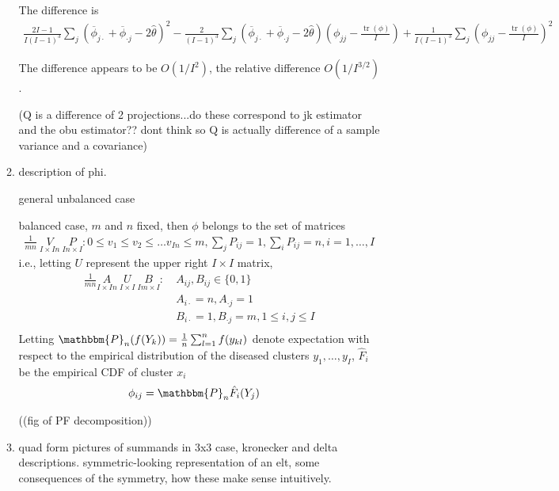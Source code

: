 \documentclass{article}
\DeclareMathOperator{\tr}{tr}
\newcommand{\I}{I}
\newcommand{\rowmean}[1]{\overline{\phi}_{#1\cdot}}
\newcommand{\colmean}[1]{\overline{\phi}_{\cdot #1}}
\begin{document}
\begin{enumerate}
\begin{enumerate}
  The difference is
  \begin{align}
    \frac{2\I-1}{\I(\I-1)^3}\sum_j(\rowmean{j} + \colmean{j} - 2\hat{\theta})^2 - \frac{2}{(\I-1)^3}\sum_j\left(\rowmean{j} + \colmean{j} - 2\hat{\theta}\right)\left(\phi_{jj}-\frac{\tr(\phi)}{\I}\right) + \frac{1}{\I(\I-1)^3}\sum_j\left(\phi_{jj}-\frac{\tr(\phi)}{\I}\right)^2
  \end{align}

  The difference appears to be $O(1/\I^2)$, the relative difference $O(1/I^{3/2})$.
  
  (Q is a difference of 2 projections...do these correspond to jk estimator and the obu estimator?? dont think so Q is actually difference of a sample variance and a covariance)







\item description of phi.

  general unbalanced case

  balanced case, $m$ and $n$ fixed, then $\phi$ belongs to the set of matrices
  \begin{align}
    \frac{1}{mn}\ \underset{\I\times \I n}{V}\ \underset{In\times\I}{P} : 0\le v_1\le v_2\le\ldots v_{\I n}\le m, \sum_jP_{ij}=1, \sum_iP_{ij}=n, i=1,\ldots,\I
  \end{align}
  i.e.,
  letting $U$ represent the upper right $\I\times\I$ matrix,
  \begin{align}
    \frac{1}{mn}\underset{\I\times \I n}{A}\ \underset{\I\times\I}{U}\ \underset{\I m\times\I}{B} :\
    & A_{ij},B_{ij}\in\{0,1\}\\
    &A_{i\cdot}=n,A_{\cdot j}=1\\
    &B_{i\cdot}=1,B_{\cdot j}=m, 1\le i,j\le \I\\
  \end{align}
  Letting $\mathbbm{P}_n(f(Y_k))=\frac{1}{n}\sum_{l=1}^nf(y_{kl})$ denote expectation with respect to the empirical distribution of the diseased clusters $y_1,\ldots,y_{\I}$,    $\hat F_i$ be the empirical CDF of cluster $x_i$
  \begin{align}
    \phi_{ij} &= \mathbbm{P}_n \hat{F}_i(Y_j)
  \end{align}
  

((fig of PF decomposition))


  
\item quad form pictures of summands in 3x3 case, kronecker and delta
descriptions. symmetric-looking representation of an elt, some
consequences of the symmetry, how these make sense intuitively.


\end{enumerate}
\end{enumerate}
\end{document}
